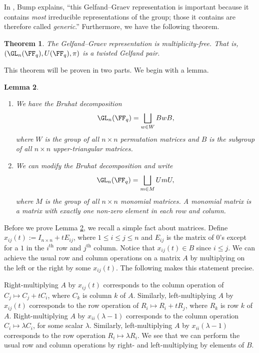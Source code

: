 \documentclass[11pt]{amsart}
\newtheorem{thm}{Theorem}
\newtheorem{lem}[thm]{Lemma}
\theoremstyle{remark}
\begin{document}
In \cite{Bump13}, Bump explains, ``this Gelfand–Graev representation is important because it contains \emph{most} irreducible representations of the group; those it contains are therefore called \emph{generic}.'' Furthermore, we have the following theorem.
\begin{thm}\label{thm: gelf_graev}
	The Gelfand--Graev representation is multiplicity-free.
	That is, $(\GL_n(\FF_q),U(\FF_q),\pi)$ is a twisted Gelfand pair.
\end{thm}
This theorem will be proven in two parts.
We begin with a lemma.
\begin{lem}\label{lemma: bruhat}
	\begin{enumerate}[\itshape(i)]
		\item We have the Bruhat decomposition
		      \[
			      \GL_n(\FF_q) = \bigsqcup_{w\in W} BwB,
		      \]
		      where $W$ is the group of all $n\times n$ permutation matrices and $B$ is the subgroup of all $n\times n$ upper-triangular matrices.
		\item We can modify the Bruhat decomposition and write
		      \[
			      \GL_n(\FF_q) = \bigsqcup_{m\in M} UmU,
		      \]
		      where $M$ is the group of all $n\times n$ monomial matrices.
		      A monomial matrix is a matrix with exactly one non-zero element in each row and column.
	\end{enumerate}
\end{lem}
Before we prove Lemma \ref{lemma: bruhat}, we recall a simple fact about matrices.
Define $x_{ij}(t) := I_{n\times n} + tE_{ij}$, where $1\leq i\leq j\leq n$ and $E_{ij}$ is the matrix of $0$'s except for a $1$ in the $i^\text{th}$ row and $j^\text{th}$ column.
Notice that $x_{ij}(t)\in B$ since $i\leq j$.
We can achieve the usual row and column operations on a matrix $A$ by multiplying on the left or the right by some $x_{ij}(t)$.
The following makes this statement precise.

Right-multiplying $A$ by $x_{ij}(t)$ corresponds to the column operation of $C_j\mapsto C_j+tC_i$, where $C_k$ is column $k$ of $A$.
Similarly, left-multiplying $A$ by $x_{ij}(t)$ corresponds to the row operation of $R_i \mapsto R_i+tR_j$, where $R_k$ is row $k$ of $A$.
Right-multiplying $A$ by $x_{ii}(\lambda-1)$ corresponds to the column operation $C_i\mapsto \lambda C_i$, for some scalar $\lambda$.
Similarly, left-multiplying $A$ by $x_{ii}(\lambda-1)$ corresponds to the row operation $R_i\mapsto\lambda R_i$.
We see that we can perform the usual row and column operations by right- and left-multiplying by elements of $B$.
\end{document}
